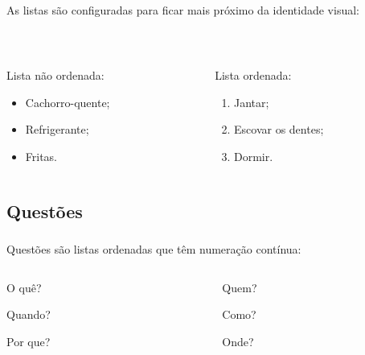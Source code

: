 \documentclass[aspectratio=169]{beamer}
\begin{document}
\begin{frame}[t]\frametitle{\secname}\framesubtitle{\subsecname}
  As listas são configuradas para ficar mais próximo da identidade visual:

  ~
  \begin{columns}[T]
    \begin{column}{.5\textwidth}
      Lista não ordenada:
      \begin{itemize}
        \item Cachorro-quente;
        \item Refrigerante;
        \item Fritas.
      \end{itemize}
    \end{column}
    \begin{column}{.5\textwidth}
      Lista ordenada:
      \begin{enumerate}
        \item Jantar;
        \item Escovar os dentes;
        \item Dormir.
      \end{enumerate}
    \end{column}
  \end{columns}
\end{frame}

\subsection{Questões}

\begin{frame}[t]\frametitle{\secname}\framesubtitle{\subsecname}
  Questões são listas ordenadas que têm numeração contínua:
  \begin{columns}[T]
    \begin{column}{.5\textwidth}
      \begin{questoes}
        \item O quê?
        \item Quando?
        \item Por que?
      \end{questoes}
    \end{column}
    \begin{column}{.5\textwidth}
      \begin{questoes}
        \item Quem?
        \item Como?
        \item Onde?
      \end{questoes}
    \end{column}
  \end{columns}
\end{frame}
\end{document}
